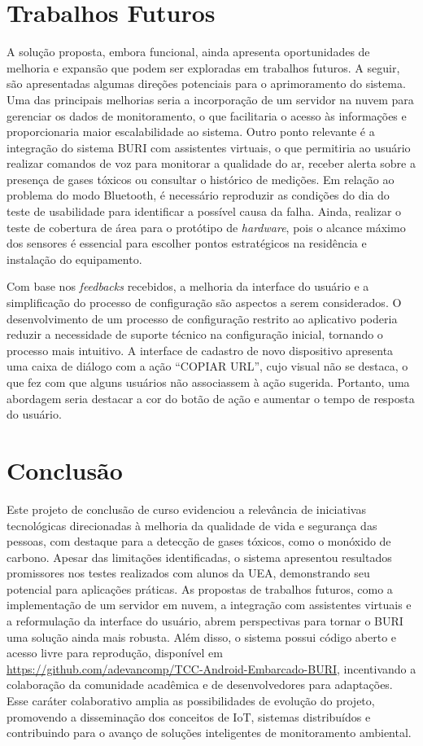 \section{Trabalhos Futuros}\label{cap5:trabalhos-futuros}

A solução proposta, embora funcional, ainda apresenta oportunidades de melhoria e expansão que podem ser exploradas em trabalhos futuros. A seguir, são apresentadas algumas direções potenciais para o aprimoramento do sistema. Uma das 
principais melhorias seria a incorporação de um servidor na nuvem para gerenciar os dados de monitoramento, o que facilitaria o acesso às informações e proporcionaria maior escalabilidade ao sistema. Outro ponto relevante é a integração do sistema 
BURI com assistentes virtuais, o que permitiria ao usuário realizar comandos de voz para monitorar a qualidade do ar, receber alerta sobre a presença de gases tóxicos ou consultar o histórico de medições. Em relação ao problema do modo 
Bluetooth, é necessário reproduzir as condições do dia do teste de usabilidade para identificar a possível causa da falha. Ainda, realizar o teste de cobertura de área para o protótipo de \textit{hardware}, pois o alcance máximo dos sensores 
é essencial para escolher pontos estratégicos na residência e instalação do equipamento.

Com base nos \textit{feedbacks} recebidos, a melhoria da interface do usuário e a simplificação do processo de configuração são aspectos a serem considerados. O desenvolvimento de um processo de configuração restrito ao aplicativo poderia reduzir a 
necessidade de suporte técnico na configuração inicial, tornando o processo mais intuitivo. A interface de cadastro de novo dispositivo apresenta uma caixa de diálogo com a ação ``COPIAR URL'', cujo visual não se destaca, o que fez com que alguns 
usuários não associassem à ação sugerida. Portanto, uma abordagem seria destacar a cor do botão de ação e aumentar o tempo 
de resposta do usuário.

\section{Conclusão}\label{cap5:conclusao}

Este projeto de conclusão de curso evidenciou a relevância de iniciativas tecnológicas direcionadas à melhoria da qualidade de vida e segurança das pessoas, com destaque para 
a detecção de gases tóxicos, como o monóxido de carbono. Apesar das limitações identificadas, o sistema apresentou resultados promissores nos testes realizados com 
alunos da UEA, demonstrando seu potencial para aplicações práticas. As propostas de trabalhos futuros, como a implementação de um servidor em nuvem, a integração com assistentes 
virtuais e a reformulação da interface do usuário, abrem perspectivas para tornar o BURI uma solução ainda mais robusta. Além disso, o sistema possui código aberto e acesso livre 
para reprodução, disponível em \url{https://github.com/adevancomp/TCC-Android-Embarcado-BURI}, incentivando a colaboração da comunidade acadêmica e de desenvolvedores para adaptações. Esse caráter colaborativo amplia as possibilidades de evolução do projeto, 
promovendo a disseminação dos conceitos de IoT, sistemas distribuídos e contribuindo para o avanço de soluções inteligentes de monitoramento ambiental.